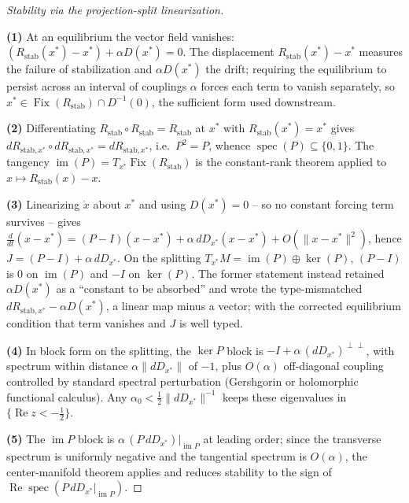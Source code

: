\begin{proof}[Stability via the projection-split linearization]
\label{proof:bk1_sketch_stability_drift_reflection}
\leavevmode

\textbf{(1)} At an equilibrium the vector field vanishes: $(R_{\mathrm{stab}}(x^*) - x^*) + \alpha D(x^*) = 0$. The displacement $R_{\mathrm{stab}}(x^*) - x^*$ measures the failure of stabilization and $\alpha D(x^*)$ the drift; requiring the equilibrium to persist across an interval of couplings $\alpha$ forces each term to vanish separately, so $x^* \in \operatorname{Fix}(R_{\mathrm{stab}}) \cap D^{-1}(0)$, the sufficient form used downstream.

\textbf{(2)} Differentiating $R_{\mathrm{stab}} \circ R_{\mathrm{stab}} = R_{\mathrm{stab}}$ at $x^*$ with $R_{\mathrm{stab}}(x^*) = x^*$ gives $dR_{\mathrm{stab},x^*} \circ dR_{\mathrm{stab},x^*} = dR_{\mathrm{stab},x^*}$, i.e.\ $P^2 = P$, whence $\operatorname{spec}(P) \subseteq \{0,1\}$. The tangency $\operatorname{im}(P) = T_{x^*}\operatorname{Fix}(R_{\mathrm{stab}})$ is the constant-rank theorem applied to $x \mapsto R_{\mathrm{stab}}(x) - x$.

\textbf{(3)} Linearizing $\dot{x}$ about $x^*$ and using $D(x^*) = 0$ -- so no constant forcing term survives -- gives $\tfrac{d}{dt}(x - x^*) = (P - I)(x - x^*) + \alpha\,dD_{x^*}(x - x^*) + O(\|x - x^*\|^2)$, hence $J = (P - I) + \alpha\,dD_{x^*}$. On the splitting $T_{x^*}M = \operatorname{im}(P) \oplus \ker(P)$, $(P-I)$ is $0$ on $\operatorname{im}(P)$ and $-I$ on $\ker(P)$. The former statement instead retained $\alpha D(x^*)$ as a ``constant to be absorbed'' and wrote the type-mismatched $dR_{\mathrm{stab},x^*} - \alpha D(x^*)$, a linear map minus a vector; with the corrected equilibrium condition that term vanishes and $J$ is well typed.

\textbf{(4)} In block form on the splitting, the $\ker P$ block is $-I + \alpha\,(dD_{x^*})^{\perp\perp}$, with spectrum within distance $\alpha\|dD_{x^*}\|$ of $-1$, plus $O(\alpha)$ off-diagonal coupling controlled by standard spectral perturbation (Gershgorin or holomorphic functional calculus). Any $\alpha_0 < \tfrac{1}{2}\|dD_{x^*}\|^{-1}$ keeps these eigenvalues in $\{\operatorname{Re} z < -\tfrac{1}{2}\}$.

\textbf{(5)} The $\operatorname{im} P$ block is $\alpha\,(P\,dD_{x^*})|_{\operatorname{im} P}$ at leading order; since the transverse spectrum is uniformly negative and the tangential spectrum is $O(\alpha)$, the center-manifold theorem applies and reduces stability to the sign of $\operatorname{Re}\operatorname{spec}(P\,dD_{x^*}|_{\operatorname{im} P})$.
\end{proof}

